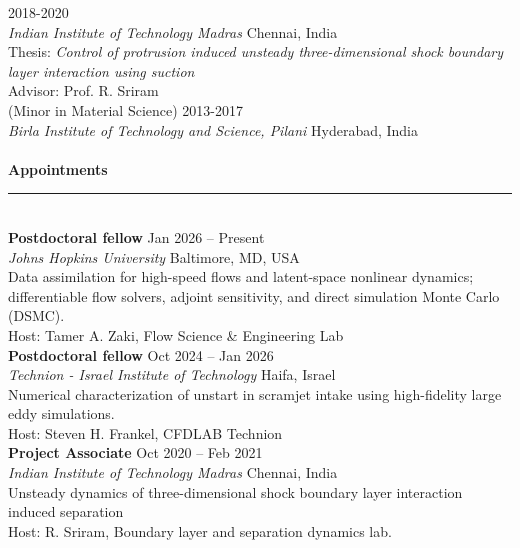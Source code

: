  \hfill {2018-2020} \\
\textit{Indian Institute of Technology Madras} \hfill {Chennai, India}\\
Thesis: \textit{Control of protrusion induced unsteady three-dimensional shock boundary layer interaction using suction} \\ Advisor: Prof. R. Sriram \\[0.5mm]

 {(Minor in Material Science)} \hfill {2013-2017} \\
\textit{Birla Institute of Technology and Science, Pilani}  \hfill {Hyderabad, India}\\

\ \\[2mm]
\noindent \textbf{\large{Appointments}}\\[-2.5mm]
\noindent\rule{\textwidth}{0.4pt} \\[-2mm]

\noindent \textbf{Postdoctoral fellow} \hfill Jan 2026 – Present\\
\textit{Johns Hopkins University} \hfill {Baltimore, MD, USA}\\
Data assimilation for high-speed flows and latent-space nonlinear dynamics; differentiable flow solvers, adjoint sensitivity, and direct simulation Monte Carlo (DSMC). \\
Host: Tamer A. Zaki, Flow Science \& Engineering Lab \\

\noindent \textbf{Postdoctoral fellow} \hfill Oct 2024 – Jan 2026\\
\textit{Technion - Israel Institute of Technology} \hfill {Haifa, Israel}\\
Numerical characterization of unstart in scramjet intake using high-fidelity large eddy simulations. \\
Host: Steven H. Frankel, CFDLAB Technion \\

\noindent \textbf{Project Associate} \hfill Oct 2020 – Feb 2021\\
\textit{Indian Institute of Technology Madras} \hfill {Chennai, India}\\
Unsteady dynamics of three-dimensional shock boundary layer interaction induced separation \\
Host: R. Sriram, Boundary layer and separation dynamics lab. \\

